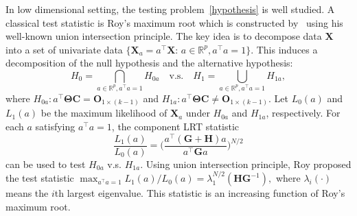 \documentclass[12pt]{article} %
\newcommand{\bX}{\mathbf{X}}
\newcommand{\bH}{\mathbf{H}}
\newcommand{\bG}{\mathbf{G}}
\newcommand{\bC}{\mathbf{C}}
\newcommand{\bO}{\mathbf{O}}
\newcommand{\bfsym}[1]{\ensuremath{\boldsymbol{#1}}}
\def\bTheta {\bfsym {\Theta}}
\theoremstyle{definition}
\begin{document}
In low dimensional setting, the testing problem~\eqref{hypothesis} is well studied.
A classical test statistic is Roy's maximum root which is constructed by~\cite{Roy1953} using his well-known union intersection principle.
        The key idea is to decompose data $\bX$ into a set of univariate data $\{\bX_{a}=a^\top \bX:\, a\in \mathbb{R}^p, a^\top a=1\}$.
        This induces a decomposition of the null hypothesis and the alternative hypothesis:
        $$
        H_0=\bigcap_{a\in\mathbb{R}^p, a^\top a=1} H_{0a} \quad \text{v.s.} \quad 
        H_1=\bigcup_{a\in\mathbb{R}^p, a^\top a=1} H_{1a},
        $$
        where 
 $H_{0a}: a^\top \bTheta \bC = \bO_{1\times (k-1)}$ and  $H_{1a} : a^\top \bTheta \bC \neq \bO_{1\times (k-1)}$.
Let $L_0(a)$ and $L_1(a)$ be the maximum likelihood of $\bX_a$ under $H_{0a}$ and $H_{1a}$, respectively.
For each $a$ satisfying $a^\top a=1$, the component LRT statistic
$$ \frac{L_1(a)}{L_0(a)}=\Big(\frac{a^\top(\bG+\bH) a}{a^\top \bG a}\Big)^{N/2}$$
can be used to test $H_{0a}$ v.s. $H_{1a}$. 
Using union intersection principle, Roy proposed the test statistic
$
\max_{a^\top a=1}  {L_1(a)}/{L_0(a)}=\lambda_{1}^{N/2}(\bH\bG^{-1}),
$
where $\lambda_{i}(\cdot)$ means the $i$th largest eigenvalue.
This statistic is an increasing function of Roy's maximum root.
\end{document}
